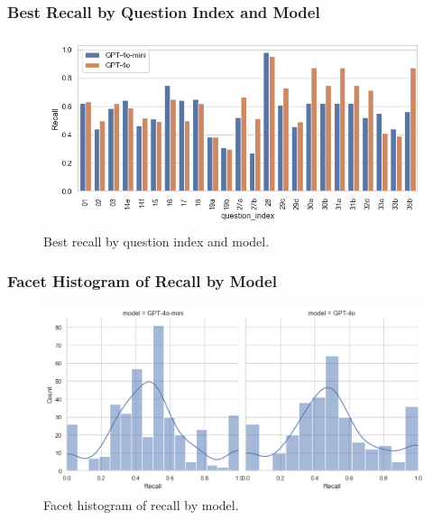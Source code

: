             \subsubsection{Best Recall by Question Index and Model}
            \begin{figure}[H]
                \centering
                \includegraphics[scale=0.75]{images_exp2/recall/best_recall_by_question_index_and_model.png}
                \caption{Best recall by question index and model.}
                \label{fig:best_recall_by_question_index_and_model}
            \end{figure}

            \subsubsection{Facet Histogram of Recall by Model}
            \begin{figure}[H]
                \centering
                \includegraphics[width=\textwidth]{images_exp2/recall/facet_hist_recall_by_model.png}
                \caption{Facet histogram of recall by model.}
                \label{fig:facet_hist_recall_by_model}
            \end{figure}


